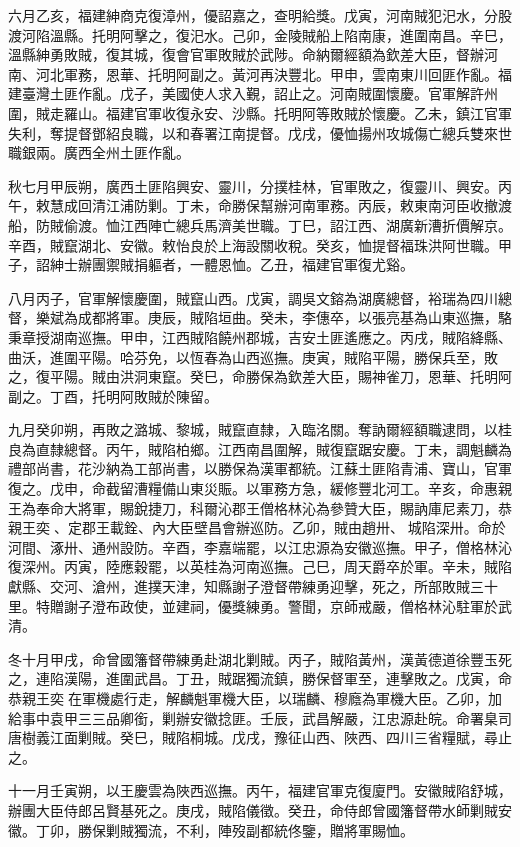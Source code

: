 \begin{pinyinscope}
六月乙亥，福建紳商克復漳州，優詔嘉之，查明給獎。戊寅，河南賊犯汜水，分股渡河陷溫縣。托明阿擊之，復汜水。己卯，金陵賊船上陷南康，進圍南昌。辛巳，溫縣紳勇敗賊，復其城，復會官軍敗賊於武陟。命納爾經額為欽差大臣，督辦河南、河北軍務，恩華、托明阿副之。黃河再決豐北。甲申，雲南東川回匪作亂。福建臺灣土匪作亂。戊子，美國使人求入覲，詔止之。河南賊圍懷慶。官軍解許州圍，賊走羅山。福建官軍收復永安、沙縣。托明阿等敗賊於懷慶。乙未，鎮江官軍失利，奪提督鄧紹良職，以和春署江南提督。戊戌，優恤揚州攻城傷亡總兵雙來世職銀兩。廣西全州土匪作亂。

秋七月甲辰朔，廣西土匪陷興安、靈川，分撲桂林，官軍敗之，復靈川、興安。丙午，敕慧成回清江浦防剿。丁未，命勝保幫辦河南軍務。丙辰，敕東南河臣收撤渡船，防賊偷渡。恤江西陣亡總兵馬濟美世職。丁巳，詔江西、湖廣新漕折價解京。辛酉，賊竄湖北、安徽。敕怡良於上海設關收稅。癸亥，恤提督福珠洪阿世職。甲子，詔紳士辦團禦賊捐軀者，一體恩恤。乙丑，福建官軍復尤谿。

八月丙子，官軍解懷慶圍，賊竄山西。戊寅，調吳文鎔為湖廣總督，裕瑞為四川總督，樂斌為成都將軍。庚辰，賊陷垣曲。癸未，李僡卒，以張亮基為山東巡撫，駱秉章授湖南巡撫。甲申，江西賊陷饒州郡城，吉安土匪遙應之。丙戌，賊陷絳縣、曲沃，進圍平陽。哈芬免，以恆春為山西巡撫。庚寅，賊陷平陽，勝保兵至，敗之，復平陽。賊由洪洞東竄。癸巳，命勝保為欽差大臣，賜神雀刀，恩華、托明阿副之。丁酉，托明阿敗賊於陳留。

九月癸卯朔，再敗之潞城、黎城，賊竄直隸，入臨洺關。奪訥爾經額職逮問，以桂良為直隸總督。丙午，賊陷柏鄉。江西南昌圍解，賊復竄踞安慶。丁未，調魁麟為禮部尚書，花沙納為工部尚書，以勝保為漢軍都統。江蘇土匪陷青浦、寶山，官軍復之。戊申，命截留漕糧備山東災賑。以軍務方急，緩修豐北河工。辛亥，命惠親王為奉命大將軍，賜銳捷刀，科爾沁郡王僧格林沁為參贊大臣，賜訥庫尼素刀，恭親王奕、定郡王載銓、內大臣壁昌會辦巡防。乙卯，賊由趙卅、城陷深卅。命於河間、涿卅、通州設防。辛酉，李嘉端罷，以江忠源為安徽巡撫。甲子，僧格林沁復深州。丙寅，陸應穀罷，以英桂為河南巡撫。己巳，周天爵卒於軍。辛未，賊陷獻縣、交河、滄州，進撲天津，知縣謝子澄督帶練勇迎擊，死之，所部敗賊三十里。特贈謝子澄布政使，並建祠，優獎練勇。警聞，京師戒嚴，僧格林沁駐軍於武清。

冬十月甲戌，命曾國籓督帶練勇赴湖北剿賊。丙子，賊陷黃州，漢黃德道徐豐玉死之，連陷漢陽，進圍武昌。丁丑，賊踞獨流鎮，勝保督軍至，連擊敗之。戊寅，命恭親王奕在軍機處行走，解麟魁軍機大臣，以瑞麟、穆廕為軍機大臣。乙卯，加給事中袁甲三三品卿銜，剿辦安徽捻匪。壬辰，武昌解嚴，江忠源赴皖。命署臬司唐樹義江面剿賊。癸巳，賊陷桐城。戊戌，豫征山西、陜西、四川三省糧賦，尋止之。

十一月壬寅朔，以王慶雲為陜西巡撫。丙午，福建官軍克復廈門。安徽賊陷舒城，辦團大臣侍郎呂賢基死之。庚戌，賊陷儀徵。癸丑，命侍郎曾國籓督帶水師剿賊安徽。丁卯，勝保剿賊獨流，不利，陣歿副都統佟鑒，贈將軍賜恤。


\end{pinyinscope}
